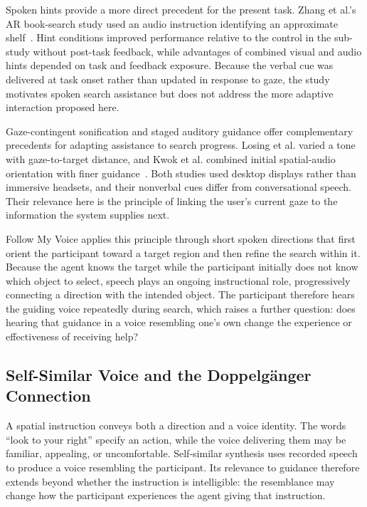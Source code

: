Spoken hints provide a more direct precedent for the present task. Zhang et al.'s AR book-search study used an audio instruction identifying an approximate shelf~\cite{zhang2023seehear}. Hint conditions improved performance relative to the control in the sub-study without post-task feedback, while advantages of combined visual and audio hints depended on task and feedback exposure. Because the verbal cue was delivered at task onset rather than updated in response to gaze, the study motivates spoken search assistance but does not address the more adaptive interaction proposed here.

Gaze-contingent sonification and staged auditory guidance offer complementary precedents for adapting assistance to search progress. Losing et al. varied a tone with gaze-to-target distance, and Kwok et al. combined initial spatial-audio orientation with finer guidance~\cite{losing2014guiding,kwok2022twostep}. Both studies used desktop displays rather than immersive headsets, and their nonverbal cues differ from conversational speech. Their relevance here is the principle of linking the user's current gaze to the information the system supplies next.

Follow My Voice applies this principle through short spoken directions that first orient the participant toward a target region and then refine the search within it. Because the agent knows the target while the participant initially does not know which object to select, speech plays an ongoing instructional role, progressively connecting a direction with the intended object. The participant therefore hears the guiding voice repeatedly during search, which raises a further question: does hearing that guidance in a voice resembling one's own change the experience or effectiveness of receiving help?

\subsection{Self-Similar Voice and the Doppelg\"anger Connection}
A spatial instruction conveys both a direction and a voice identity. The words ``look to your right'' specify an action, while the voice delivering them may be familiar, appealing, or uncomfortable. Self-similar synthesis uses recorded speech to produce a voice resembling the participant. Its relevance to guidance therefore extends beyond whether the instruction is intelligible: the resemblance may change how the participant experiences the agent giving that instruction.

